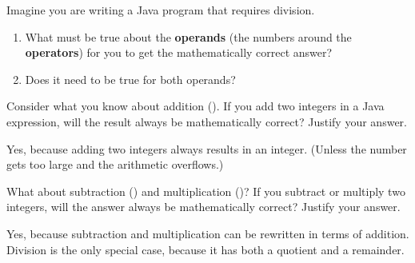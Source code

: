 \Q Imagine you are writing a Java program that requires division.

\begin{enumerate}
\item What must be true about the \textbf{operands} (the numbers around the \textbf{operators}) for you to get the mathematically correct answer?

\vspace{1ex}

\item Does it need to be true for both operands? 
\vspace{1ex}
\end{enumerate}


\Q Consider what you know about addition (\java{+}).
If you add two integers in a Java expression, will the result always be mathematically correct?
Justify your answer.

\begin{answer}
Yes, because adding two integers always results in an integer.
(Unless the number gets too large and the arithmetic overflows.)
\end{answer}


\Q What about subtraction (\java{-}) and multiplication (\java{*})? If you subtract or multiply two integers, will the answer always be mathematically correct? Justify your answer.

\begin{answer}
Yes, because subtraction and multiplication can be rewritten in terms of addition.
Division is the only special case, because it has both a quotient and a remainder.
\end{answer}
